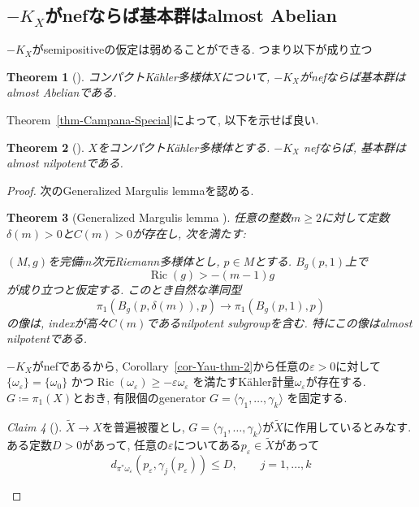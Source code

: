 \documentclass[dvipdfmx,a4paper,11pt]{article} %
\newtheorem{thm}{Theorem}[section]
\theoremstyle{definition}
\theoremstyle{remark}
\newtheorem{claim}[thm]{Claim}
\numberwithin{equation}{section}
\DeclareMathOperator{\Ric}{Ric}
\begin{document}
 \subsection{$-K_X$がnefならば基本群はalmost Abelian }
 $-K_X$がsemipositiveの仮定は弱めることができる. つまり以下が成り立つ
\begin{thm}[{\cite{Paun98}}]
コンパクトK\"ahler多様体$X$について, $-K_X$がnefならば基本群はalmost Abelianである. 
\end{thm}
Theorem~\ref{thm-Campana-Special}によって, 以下を示せば良い. 
\begin{thm}[{\cite{Paun98}}]
\label{thm-Paun-thm}
$X$をコンパクトK\"ahler多様体とする. 
$-K_X$ nefならば, 
基本群はalmost nilpotentである. 
\end{thm}
\begin{proof}
次のGeneralized Margulis lemmaを認める. 
\begin{thm}[Generalized Margulis lemma {\cite[Theorem 1]{KW11}}]
\label{thm-Generalized-Margulis-lem}
任意の整数$m\geq 2$に対して定数$\delta(m)>0$と$C(m)>0$が存在し, 次を満たす: 

$(M,g)$を完備$m$次元Riemann多様体とし, $p\in M$とする. $B_g(p,1)$上で
\[
\Ric(g)>-(m-1)g
\]
が成り立つと仮定する. このとき自然な準同型
\[
\pi_1(B_g(p,\delta(m)),p)\longrightarrow \pi_1(B_g(p,1),p)
\]
の像は, indexが高々$C(m)$であるnilpotent subgroupを含む. 特にこの像はalmost nilpotentである.
\end{thm}

$-K_X$がnefであるから, Corollary~\ref{cor-Yau-thm-2}から任意の$\varepsilon>0$に対して
\(
\{\omega_\varepsilon\}=\{\omega_0\}\) かつ\(\Ric(\omega_\varepsilon)\geq-\varepsilon\omega_\varepsilon
\)
を満たすK\"ahler計量$\omega_\varepsilon$が存在する. 
$G\coloneqq \pi_1(X)$とおき, 有限個のgenerator
\(
G=\langle\gamma_1,\ldots,\gamma_k\rangle
\)
を固定する.
\begin{claim}[{\cite[Lemma 1.3]{DPS96}}]
\label{claim-uniformD}
$\widetilde{X} \to X$を普遍被覆とし, $G=\langle\gamma_1,\ldots,\gamma_k\rangle$が$\widetilde{X}$に作用しているとみなす.
ある定数$D>0$があって, 任意の$\varepsilon$についてある$p_\varepsilon\in\widetilde X$があって
\[
d_{\pi^{*}\omega_\varepsilon}(p_\varepsilon,\gamma_j(p_\varepsilon))\leq D,\qquad j=1,\ldots,k
\]
\end{claim}


\end{proof}
\end{document}
